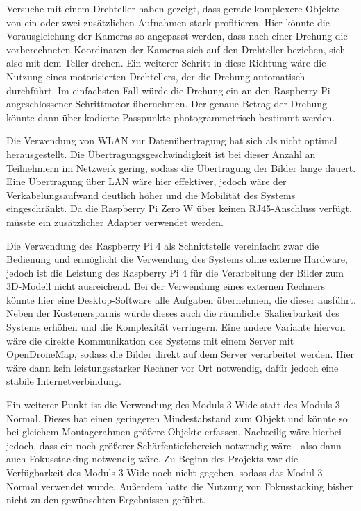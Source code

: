 \documentclass[./00PhotoBox.tex]{subfiles}
\begin{document}
Versuche mit einem Drehteller haben gezeigt, dass gerade komplexere Objekte von ein oder zwei zusätzlichen Aufnahmen stark profitieren. Hier könnte die Vorausgleichung der Kameras so angepasst werden, dass nach einer Drehung die vorberechneten Koordinaten der Kameras sich auf den Drehteller beziehen, sich also mit dem Teller drehen. Ein weiterer Schritt in diese Richtung wäre die Nutzung eines motorisierten Drehtellers, der die Drehung au\-to\-ma\-tisch durchführt. Im einfachsten Fall würde die Drehung ein an den Raspberry Pi angeschlossener Schrittmotor übernehmen. Der genaue Betrag der Drehung könnte dann über kodierte Passpunkte photogrammetrisch bestimmt werden.

Die Verwendung von WLAN zur Datenübertragung hat sich als nicht optimal herausgestellt. Die Übertragungsgeschwindigkeit ist bei dieser Anzahl an Teilnehmern im Netzwerk gering, sodass die Übertragung der Bilder lange dauert. Eine Übertragung über LAN wäre hier effektiver, jedoch wäre der Verkabelungsaufwand deutlich höher und die Mobilität des Systems eingeschränkt. Da die Raspberry Pi Zero W über keinen RJ45-Anschluss verfügt, müsste ein zusätzlicher Adapter verwendet werden.

Die Verwendung des Raspberry Pi 4 als Schnittstelle vereinfacht zwar die Bedienung und ermöglicht die Verwendung des Systems ohne externe Hardware, jedoch ist die Leistung des Raspberry Pi 4 für die Verarbeitung der Bilder zum 3D-Modell nicht ausreichend. Bei der Verwendung eines externen Rechners könnte hier eine Desktop-Software alle Aufgaben übernehmen, die dieser ausführt. Neben der Kostenersparnis würde dieses auch die räumliche Skalierbarkeit des Systems erhöhen und die Komplexität verringern. Eine andere Variante hiervon wäre die direkte Kommunikation des Systems mit einem Server mit OpenDroneMap, sodass die Bilder direkt auf dem Server verarbeitet werden. Hier wäre dann kein leistungsstarker Rechner vor Ort notwendig, dafür jedoch eine stabile Internetverbindung.

Ein weiterer Punkt ist die Verwendung des Moduls 3 Wide statt des Moduls 3 Normal. Dieses hat einen geringeren Mindestabstand zum Objekt und könnte so bei gleichem Montagerahmen größere Objekte erfassen. Nachteilig wäre hierbei jedoch, dass ein noch größerer Schärfentiefebereich notwendig wäre - also dann auch Fokusstacking notwendig wäre. Zu Beginn des Projekts war die Verfügbarkeit des Moduls 3 Wide noch nicht gegeben, sodass das Modul 3 Normal verwendet wurde. Außerdem hatte die Nutzung von Fokusstacking bisher nicht zu den gewünschten Ergebnissen geführt.
\end{document}
